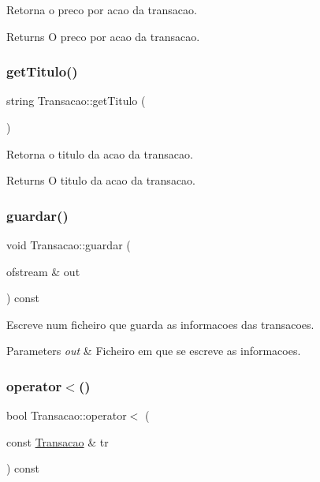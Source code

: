 Retorna o preco por acao da transacao. 

\begin{DoxyReturn}{Returns}
O preco por acao da transacao. 
\end{DoxyReturn}
\hypertarget{class_transacao_af48d21e7643548e9b8ff9ee9d1cd39c8}{}\label{class_transacao_af48d21e7643548e9b8ff9ee9d1cd39c8} 
\subsubsection{\texorpdfstring{get\+Titulo()}{getTitulo()}}
{\footnotesize\ttfamily string Transacao\+::get\+Titulo (\begin{DoxyParamCaption}{ }\end{DoxyParamCaption})}



Retorna o titulo da acao da transacao. 

\begin{DoxyReturn}{Returns}
O titulo da acao da transacao. 
\end{DoxyReturn}
\hypertarget{class_transacao_aa4b2e7563ee4cb46bea35ea5b8d5f96a}{}\label{class_transacao_aa4b2e7563ee4cb46bea35ea5b8d5f96a} 
\subsubsection{\texorpdfstring{guardar()}{guardar()}}
{\footnotesize\ttfamily void Transacao\+::guardar (\begin{DoxyParamCaption}\item[{ofstream \&}]{out }\end{DoxyParamCaption}) const}



Escreve num ficheiro que guarda as informacoes das transacoes. 


\begin{DoxyParams}{Parameters}
{\em out} & Ficheiro em que se escreve as informacoes. \\
\hline
\end{DoxyParams}
\hypertarget{class_transacao_a99deb0eadbb36741646610299c2fecad}{}\label{class_transacao_a99deb0eadbb36741646610299c2fecad} 
\subsubsection{\texorpdfstring{operator$<$()}{operator<()}}
{\footnotesize\ttfamily bool Transacao\+::operator$<$ (\begin{DoxyParamCaption}\item[{const \hyperlink{class_transacao}{Transacao} \&}]{tr }\end{DoxyParamCaption}) const}




